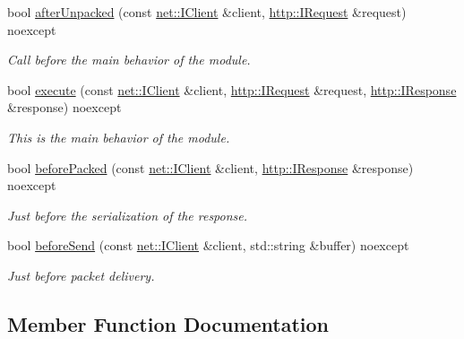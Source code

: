 \begin{DoxyCompactItemize}
bool \hyperlink{classmodule_1_1Proxy_a16524232b12bd03353c79bcda4bd8d15}{after\+Unpacked} (const \hyperlink{structnet_1_1IClient}{net\+::\+I\+Client} \&client, \hyperlink{structhttp_1_1IRequest}{http\+::\+I\+Request} \&request) noexcept
\begin{DoxyCompactList}\small\item\em Call before the main behavior of the module. \end{DoxyCompactList}\item 
bool \hyperlink{classmodule_1_1Proxy_a7a210c144da81f379a7ca6b7ef7914c8}{execute} (const \hyperlink{structnet_1_1IClient}{net\+::\+I\+Client} \&client, \hyperlink{structhttp_1_1IRequest}{http\+::\+I\+Request} \&request, \hyperlink{structhttp_1_1IResponse}{http\+::\+I\+Response} \&response) noexcept
\begin{DoxyCompactList}\small\item\em This is the main behavior of the module. \end{DoxyCompactList}\item 
bool \hyperlink{classmodule_1_1Proxy_a3b88487ecaaa856f319d78f2aa6358c1}{before\+Packed} (const \hyperlink{structnet_1_1IClient}{net\+::\+I\+Client} \&client, \hyperlink{structhttp_1_1IResponse}{http\+::\+I\+Response} \&response) noexcept
\begin{DoxyCompactList}\small\item\em Just before the serialization of the response. \end{DoxyCompactList}\item 
bool \hyperlink{classmodule_1_1Proxy_a314d53ca09edbb7f2595cefb5c55771e}{before\+Send} (const \hyperlink{structnet_1_1IClient}{net\+::\+I\+Client} \&client, std\+::string \&buffer) noexcept
\begin{DoxyCompactList}\small\item\em Just before packet delivery. \end{DoxyCompactList}\end{DoxyCompactItemize}


\subsection{Member Function Documentation}
\mbox{\label{classmodule_1_1Proxy_a0dbbd27ea29602830d770c5c550b1ee4}} 
